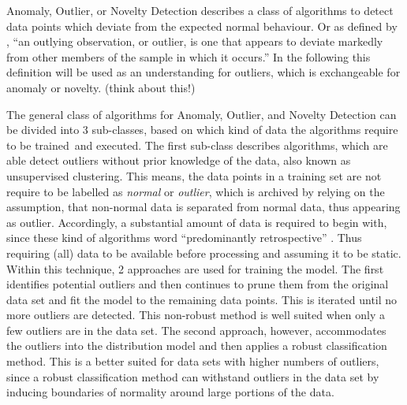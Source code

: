 Anomaly, Outlier, or Novelty Detection describes a class of algorithms to detect data points which deviate from the expected normal behaviour.
Or as defined by \textcite{Grubbs1969}, \enquote{an outlying observation, or outlier, is one that appears to deviate markedly from other members of the sample in which it occurs.}
In the following this definition will be used as an understanding for outliers, which is exchangeable for anomaly or novelty. \alert{(think about this!)}

The general class of algorithms for Anomaly, Outlier, and Novelty Detection can be divided into 3 sub-classes, based on which kind of data the algorithms require to be trained\alert{~and executed}.
The first sub-class describes algorithms, which are able detect outliers without prior knowledge of the data, also known as unsupervised clustering.
This means, the data points in a training set are not require to be labelled as \emph{normal} or \emph{outlier}, which is archived by relying on the assumption, that non-normal data is separated from normal data, thus appearing as outlier.
Accordingly, a substantial amount of data is required to begin with, since these kind of algorithms word \enquote{predominantly retrospective} \parencite{Hodge2004}.
Thus requiring (all) data to be available before processing and assuming it to be static.
Within this technique, 2 approaches  are used for training the model. 
The first identifies potential outliers and then continues to prune them from the original data set and fit the model to the remaining data points. This is iterated until no more outliers are detected. This non-robust method is well suited when only a few outliers are in the data set.
The second approach, however, accommodates the outliers into the distribution model and then applies a robust classification method. This is a better suited for data sets with higher numbers of outliers, since a robust classification method can withstand outliers in the data set by inducing boundaries of normality around large portions of the data. \parencite[cf.][]{Hodge2004}

